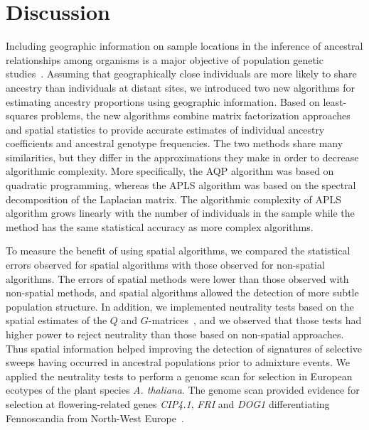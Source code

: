 \clearpage
\newpage



\section{Discussion}
Including geographic information on sample locations in the inference of ancestral relationships among  organisms is a major objective of population genetic studies~\citep{Malecot1948, Cavalli-Sforza1994, Epperson2003}. Assuming that geographically close individuals are more likely to share ancestry than individuals at distant sites, we introduced two new  algorithms for estimating ancestry proportions using geographic information. Based on least-squares problems, the new algorithms combine matrix factorization approaches and spatial statistics to provide accurate estimates of individual ancestry coefficients and ancestral genotype frequencies. The two methods share many similarities, but they differ in the approximations they make in order to decrease algorithmic complexity.  More specifically, the AQP algorithm was based on quadratic programming, whereas the APLS algorithm was based on the spectral decomposition of the Laplacian matrix. The algorithmic complexity of APLS algorithm grows linearly with the number of individuals in the sample while the method has the same statistical accuracy as more complex algorithms. 


To measure the benefit of using spatial algorithms, we compared the statistical errors observed for spatial algorithms with those observed for non-spatial algorithms. The errors of spatial methods were lower than those observed  with non-spatial methods, and spatial algorithms allowed the detection of more subtle population structure. In addition, we implemented neutrality tests based on the spatial estimates of the $Q$ and $G$-matrices~\citep{Martins2016}, and we observed that those tests had higher power to reject neutrality than those based on non-spatial approaches. Thus spatial information helped improving the detection of signatures of selective sweeps having occurred  in ancestral populations prior to admixture events. We applied the neutrality tests to perform a genome scan for selection in European ecotypes of the plant species {\it A. thaliana}. The genome scan provided evidence for selection at flowering-related genes {\it CIP4.1}, {\it FRI} and {\it DOG1} differentiating Fennoscandia from North-West Europe~\citep{Horton2012}.

